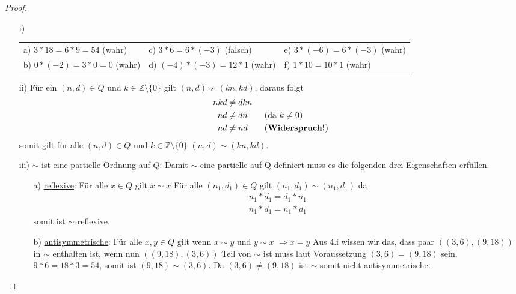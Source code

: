 \documentclass{exam}
\begin{document}
\begin{proof} \ \newline
	\begin{enumerate}
		\item [i)]
		      \renewcommand{\arraystretch}{1.5}
		      \begin{tabularx}{\textwidth}{ X X X }
			      a) $3*18 = 6*9 = 54$ (wahr)  & c) $3*6 = 6*(-3)$ (falsch)  & e) $3*(-6) = 6 * (-3)$ (wahr) \\
			      b) $0*(-2) = 3*0 = 0$ (wahr) & d) $(-4)*(-3)= 12*1$ (wahr) & f) $1*10 = 10*1$ (wahr)
		      \end{tabularx}
		\item [ii)] Für ein $(n,d) \in Q$ und $k \in \mathbb{Z}\setminus\{0\}$ gilt $(n,d) \not\sim (kn,kd)$, daraus folgt
		      \begin{align}
			      nkd & \neq dkn                            \\
			      nd  & \neq dn \tag{da $k \neq 0$}         \\
			      nd  & \neq nd \tag{\textbf{Widerspruch!}}
		      \end{align}
		      somit gilt für alle $(n,d) \in Q$ und $k \in \mathbb{Z}\setminus\{0\}$ $(n,d) \sim (kn,kd)$.
		\item [iii)] $\sim$ ist eine partielle Ordnung auf $Q$: \newline
		      Damit $\sim$ eine partielle auf Q definiert muss es die folgenden drei Eigenschaften erfüllen.
		      \begin{enumerate}
			      \item [a)] \underline{reflexive}: Für alle $x \in Q$ gilt $x \sim x$ \newline
			            Für alle $(n_1,d_1) \in Q$ gilt $(n_1, d_1) \sim (n_1, d_1)$ da \begin{align}
				            n_1*d_1 = d_1*n_1 \\
				            n_1*d_1 = n_1*d_1
			            \end{align} somit ist $\sim$ reflexive.
			      \item [b)] \underline{antisymmetrische}: Für alle $x, y \in Q$ gilt wenn $x \sim y$ und $y \sim x$ $\Rightarrow x = y$ \newline
			            Aus 4.i wissen wir das, dass paar $((3,6),(9,18))$ in $\sim$ enthalten ist, wenn nun $((9,18),(3,6))$ Teil von $\sim$ ist muss laut Voraussetzung $(3,6) = (9,18)$ sein.
			            $9*6 = 18 * 3 = 54$, somit ist $(9,18) \sim (3,6)$. Da $(3,6) \neq (9,18)$ ist $\sim$ somit nicht antisymmetrische.

\end{enumerate}
\end{enumerate}
\end{proof}
\end{document}
